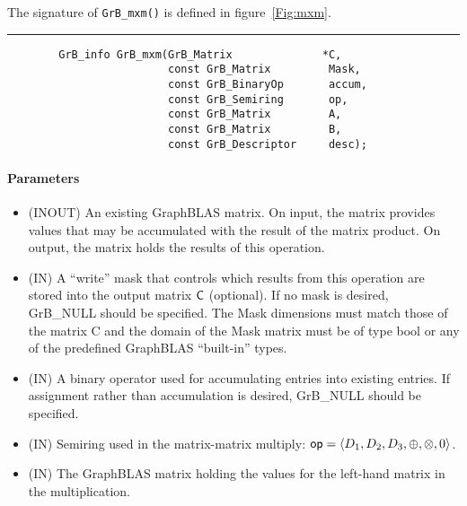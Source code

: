 The signature of {\tt GrB\_mxm()} is defined in figure~\ref{Fig:mxm}.
\begin{figure*}[h]
\hrule
\caption{The GrB\_mxm() function signature and basic argument definitions.}
\label{Fig:mxm}

\begin{verbatim}
        GrB_info GrB_mxm(GrB_Matrix              *C,
                         const GrB_Matrix         Mask,
                         const GrB_BinaryOp       accum,
                         const GrB_Semiring       op,
                         const GrB_Matrix         A, 
                         const GrB_Matrix         B,
                         const GrB_Descriptor     desc);
\end{verbatim}

\paragraph{Parameters}

\begin{itemize}[leftmargin=1.1in]
    \item[{\sf C}]    ({\sf INOUT}) An existing GraphBLAS matrix. On
    input, the matrix provides values that may be accumulated with the
    result of the matrix product.   On output, the matrix holds the
    results of this operation.

    \item[{\sf Mask}] ({\sf IN}) A ``write'' mask that controls which
    results from this operation are stored into the output matrix
    ${\sf C}$ (optional).  If no mask is desired,  {\sf GrB\_NULL}
    should be specified. The Mask dimensions must match those of the
    matrix {\sf C} and the domain of the {\sf Mask} matrix must be
    of type {\sf bool} or any of the predefined GraphBLAS ``built-in'' types.

    \item[{\sf accum}] ({\sf IN}) A binary operator used for accumulating entries
    into existing  entries. If assignment rather than accumulation is
    desired, {\sf GrB\_NULL} should be specified.

    \item[{\sf op}] ({\sf IN}) Semiring used in the matrix-matrix
    multiply: ${\sf op}=\langle D_1,D_2,D_3,\oplus,\otimes,0 \rangle$.

    \item[{\sf A}] ({\sf IN}) The GraphBLAS matrix holding the values
    for the left-hand matrix in the multiplication.


\end{itemize}
\end{figure*}
